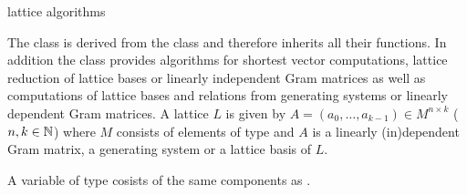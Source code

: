 
\newcommand{\factor}{\mathit{factor}}
\newcommand{\li}{\mathit{li}}



\NAME

 \dotfill lattice algorithms



\ABSTRACT

The class  is derived from the class  and therefore
inherits all their functions.  In addition the class  provides algorithms
for shortest vector computations, lattice reduction of lattice bases or linearly independent
Gram matrices as well as computations of lattice bases and relations from generating systems or
linearly dependent Gram matrices.  A lattice $L$ is given by $A = (a_0, \dots, a_{k-1}) \in M^{n
  \times k}$ ($n,k \in \mathbb{N}$) where $M$ consists of elements of type  and $A$ is a
linearly (in)dependent Gram matrix, a generating system or a lattice basis of $L$.



\DESCRIPTION

A variable of type  cosists of the same components as .

